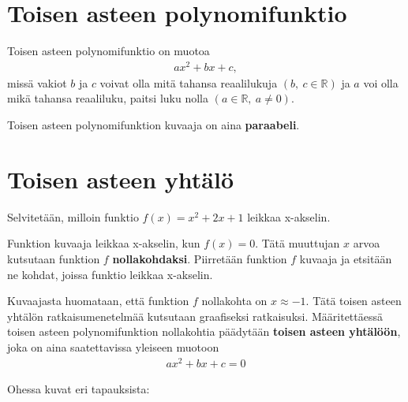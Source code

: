 \section{Toisen asteen polynomifunktio}

Toisen asteen polynomifunktio on muotoa
\begin{align*}
ax^2+bx+c,
\end{align*}
missä vakiot $b$ ja $c$ voivat olla mitä tahansa reaalilukuja $(b, \ c \in \mathbb{R})$ ja $a$ voi olla mikä tahansa reaaliluku, paitsi luku nolla $(a \in \mathbb{R}, \ a \neq 0)$.

Toisen asteen polynomifunktion kuvaaja on aina \textbf{paraabeli}.


\section{Toisen asteen yhtälö}

\begin{esimerkki}
Selvitetään, milloin funktio $f(x)=x^2+2x+1$ leikkaa x-akselin.

Funktion kuvaaja leikkaa x-akselin, kun $f(x)=0$. Tätä muuttujan $x$ arvoa kutsutaan funktion $f$ \textbf{nollakohdaksi}. Piirretään funktion $f$ kuvaaja ja etsitään ne kohdat, joissa funktio leikkaa x-akselin. %

\begin{kuvaajapohja}{1.5}{-2.5}{0.5}{-0.5}{3}
\end{kuvaajapohja}
\end{esimerkki}

Kuvaajasta huomataan, että funktion $f$ nollakohta on $x \approx -1$. Tätä toisen asteen yhtälön ratkaisumenetelmää kutsutaan graafiseksi ratkaisuksi.
Määritettäessä toisen asteen polynomifunktion nollakohtia päädytään \textbf{toisen asteen yhtälöön}, joka on aina saatettavissa yleiseen muotoon
\begin{align*}
ax^2+bx+c=0
\end{align*}

Ohessa kuvat eri tapauksista:

